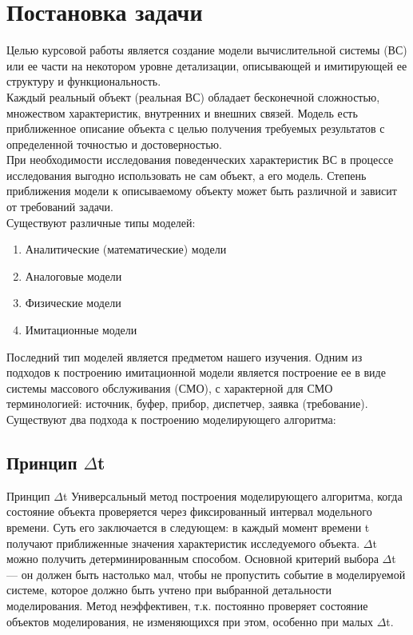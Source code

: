 \documentclass{article}
\begin{document}
	\section{Постановка задачи}
	Целью курсовой работы является создание модели вычислительной системы (ВС) или ее части на некотором уровне детализации, описывающей и имитирующей ее структуру и функциональность.\\
	Каждый реальный объект (реальная ВС) обладает бесконечной сложностью, множеством характеристик, внутренних и внешних связей. Модель есть приближенное описание объекта с целью получения требуемых результатов с определенной точностью и достоверностью.\\
	При необходимости исследования поведенческих характеристик ВС в процессе исследования выгодно использовать не сам объект, а его модель. Степень приближения модели к описываемому объекту может быть различной и зависит от требований задачи.\\
	Существуют различные типы моделей:
	\begin{enumerate}
		\item Аналитические (математические) модели
		\item Аналоговые модели
		\item Физические модели
		\item Имитационные модели 
	\end{enumerate}
	Последний тип моделей является предметом нашего изучения. Одним из подходов к построению имитационной модели является построение ее в виде системы массового обслуживания (СМО), с характерной для СМО терминологией: источник, буфер, прибор, диспетчер, заявка (требование).
	Существуют два подхода к построению моделирующего алгоритма:
	\subsection{Принцип $\Delta$t}
	Принцип $\Delta$t
	Универсальный метод построения моделирующего алгоритма, когда
	состояние объекта проверяется через фиксированный интервал
	модельного времени. Суть его заключается в следующем: в каждый
	момент времени t получают приближенные значения характеристик исследуемого объекта.  $\Delta$t можно получить детерминированным способом.
	Основной критерий выбора  $\Delta$t — он должен быть настолько мал, чтобы не пропустить событие в моделируемой системе, которое должно быть учтено при выбранной детальности моделирования. Метод неэффективен, т.к. постоянно проверяет состояние объектов моделирования, не изменяющихся при этом, особенно при малых  $\Delta$t.
	
\end{document}
